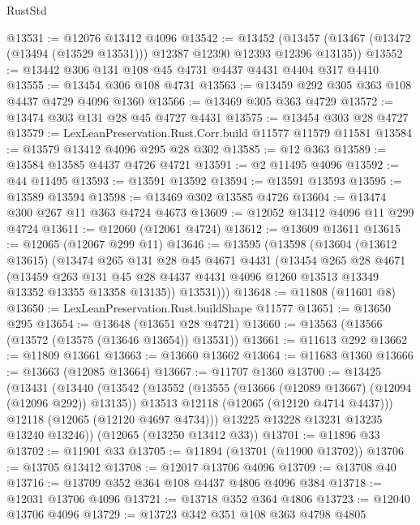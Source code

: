 \begin{lexlean}{RustStd}
\begin{coremodule}
@13531 := @12076 @13412 @4096
@13542 := @13452
    (@13457 (@13467 (@13472 (@13494 (@13529 @13531))) @12387 @12390 @12393 @12396 @13135))
@13552 := @13442 @306 @131 @108 @45 @4731 @4437 @4431 @4404 @317 @4410
@13555 := @13454 @306 @108 @4731
@13563 := @13459 @292 @305 @363 @108 @4437 @4729 @4096 @1360
@13566 := @13469 @305 @363 @4729
@13572 := @13474 @303 @131 @28 @45 @4727 @4431
@13575 := @13454 @303 @28 @4727
@13579 := LexLeanPreservation.Rust.Corr.build @11577 @11579 @11581
@13584 := @13579 @13412 @4096 @295 @28 @302
@13585 := @12 @363
@13589 := @13584 @13585 @4437 @4726 @4721
@13591 := @2 @11495 @4096
@13592 := @44 @11495
@13593 := @13591 @13592
@13594 := @13591 @13593
@13595 := @13589 @13594
@13598 := @13469 @302 @13585 @4726
@13604 := @13474 @300 @267 @11 @363 @4724 @4673
@13609 := @12052 @13412 @4096 @11 @299 @4724
@13611 := @12060 (@12061 @4724)
@13612 := @13609 @13611
@13615 := @12065 (@12067 @299 @11)
@13646 := @13595
    (@13598
      (@13604
        (@13612 @13615)
        (@13474
          @265
          @131
          @28
          @45
          @4671
          @4431
          (@13454
            @265
            @28
            @4671
            (@13459
              @263
              @131
              @45
              @28
              @4437
              @4431
              @4096
              @1260
              @13513
              @13349
              @13352
              @13355
              @13358
              @13135))
          @13531)))
@13648 := @11808 (@11601 @8)
@13650 := LexLeanPreservation.Rust.buildShape @11577
@13651 := @13650 @295
@13654 := @13648 (@13651 @28 @4721)
@13660 := @13563 (@13566 (@13572 (@13575 (@13646 @13654)) @13531))
@13661 := @11613 @292
@13662 := @11809 @13661
@13663 := @13660 @13662
@13664 := @11683 @1360
@13666 := @13663 (@12085 @13664)
@13667 := @11707 @1360
@13700 := @13425
    (@13431
      (@13440
        (@13542
          (@13552
            (@13555 (@13666 (@12089 @13667) (@12094 (@12096 @292)) @13135))
            @13513
            @12118
            (@12065 (@12120 @4714 @4437)))
          @12118
          (@12065 (@12120 @4697 @4734)))
        @13225
        @13228
        @13231
        @13235
        @13240
        @13246))
    (@12065 (@13250 @13412 @33))
@13701 := @11896 @33
@13702 := @11901 @33
@13705 := @11894 (@13701 (@11900 @13702))
@13706 := @13705 @13412
@13708 := @12017 @13706 @4096
@13709 := @13708 @40
@13716 := @13709 @352 @364 @108 @4437 @4806 @4096 @384
@13718 := @12031 @13706 @4096
@13721 := @13718 @352 @364 @4806
@13723 := @12040 @13706 @4096
@13729 := @13723 @342 @351 @108 @363 @4798 @4805

\end{coremodule}
\end{lexlean}
